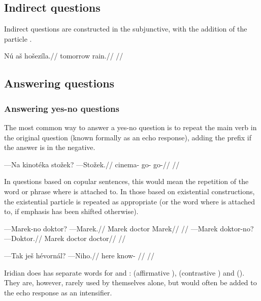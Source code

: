 \subsection{Indirect questions}

Indirect questions are constructed in the subjunctive, with the addition of the particle .

\pex
\begingl
\gla N\'u a\v{s} ho\v{s}ez\'ila.//
\glb tomorrow  rain.//
\glft {}//
\endgl
\xe

\subsection{Answering questions}\label{sec:ansyn}


\subsubsection{Answering yes-no questions}
The most common way to answer a yes-no question is to repeat the main verb in the original question (known formally as an echo response), adding the prefix  if the answer is in the negative.

\pex
\begingl
\gla ---Na kinot\'eka sto\v{z}ek? ---Sto\v{z}ek.//
\glb {} cinema- go- go-//
\glft {}//
\endgl
\xe

In questions based on copular sentences, this would mean the repetition of the word or phrase where  is attached to. In those based on existential constructions, the existential particle is repeated as appropriate (or the word where  is attached to, if emphasis has been shifted otherwise).

\pex
\a
\begingl
\gla ---Marek-no doktor? ---Marek.//
\glb Marek doctor Marek//
\glft {}//
\endgl
\a
\begingl
\gla ---Marek doktor-no? ---Doktor.//
\glb Marek doctor doctor//
\glft {}//
\endgl
\xe

\pex
\begingl
\gla ---Tak je\v{s} h\'evorn\'al? ---Niho.//
\glb here  know- //
\glft {}//
\endgl
\xe

Iridian does has separate words for  and :  (affirmative ),  (contrastive ) and  (). They are, however, rarely used by themselves alone, but would often be added to the echo response as an intensifier.

